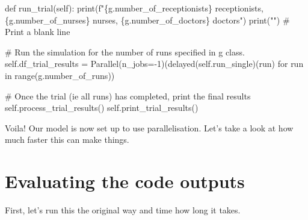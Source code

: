 \documentclass[
  letterpaper,
  DIV=11,
  numbers=noendperiod]{scrreprt}
\newenvironment{Shaded}{\begin{snugshade}}{\end{snugshade}}
\newcommand{\BuiltInTok}[1]{\textcolor[rgb]{0.00,0.23,0.31}{#1}}
\newcommand{\CommentTok}[1]{\textcolor[rgb]{0.37,0.37,0.37}{#1}}
\newcommand{\ControlFlowTok}[1]{\textcolor[rgb]{0.00,0.23,0.31}{#1}}
\newcommand{\DecValTok}[1]{\textcolor[rgb]{0.68,0.00,0.00}{#1}}
\newcommand{\KeywordTok}[1]{\textcolor[rgb]{0.00,0.23,0.31}{#1}}
\newcommand{\NormalTok}[1]{\textcolor[rgb]{0.00,0.23,0.31}{#1}}
\newcommand{\OperatorTok}[1]{\textcolor[rgb]{0.37,0.37,0.37}{#1}}
\newcommand{\SpecialCharTok}[1]{\textcolor[rgb]{0.37,0.37,0.37}{#1}}
\newcommand{\SpecialStringTok}[1]{\textcolor[rgb]{0.13,0.47,0.30}{#1}}
\newcommand{\StringTok}[1]{\textcolor[rgb]{0.13,0.47,0.30}{#1}}
\newcommand{\VariableTok}[1]{\textcolor[rgb]{0.07,0.07,0.07}{#1}}
\begin{document}
\begin{Shaded}
\begin{Highlighting}[]
\KeywordTok{def}\NormalTok{ run\_trial(}\VariableTok{self}\NormalTok{):}
    \BuiltInTok{print}\NormalTok{(}\SpecialStringTok{f"}\SpecialCharTok{\{}\NormalTok{g}\SpecialCharTok{.}\NormalTok{number\_of\_receptionists}\SpecialCharTok{\}}\SpecialStringTok{ receptionists, }\SpecialCharTok{\{}\NormalTok{g}\SpecialCharTok{.}\NormalTok{number\_of\_nurses}\SpecialCharTok{\}}\SpecialStringTok{ nurses, }\SpecialCharTok{\{}\NormalTok{g}\SpecialCharTok{.}\NormalTok{number\_of\_doctors}\SpecialCharTok{\}}\SpecialStringTok{ doctors"}\NormalTok{)}
    \BuiltInTok{print}\NormalTok{(}\StringTok{""}\NormalTok{) }\CommentTok{\# Print a blank line}

    \CommentTok{\# Run the simulation for the number of runs specified in g class.}
    \VariableTok{self}\NormalTok{.df\_trial\_results }\OperatorTok{=}\NormalTok{ Parallel(n\_jobs}\OperatorTok{={-}}\DecValTok{1}\NormalTok{)(delayed(}\VariableTok{self}\NormalTok{.run\_single)(run) }\ControlFlowTok{for}\NormalTok{ run }\KeywordTok{in} \BuiltInTok{range}\NormalTok{(g.number\_of\_runs))}

    \CommentTok{\# Once the trial (ie all runs) has completed, print the final results}
    \VariableTok{self}\NormalTok{.process\_trial\_results()}
    \VariableTok{self}\NormalTok{.print\_trial\_results()}
\end{Highlighting}
\end{Shaded}

Voila! Our model is now set up to use parallelisation. Let's take a look
at how much faster this can make things.

\section{Evaluating the code outputs}\label{evaluating-the-code-outputs}

First, let's run this the original way and time how long it takes.
\end{document}
